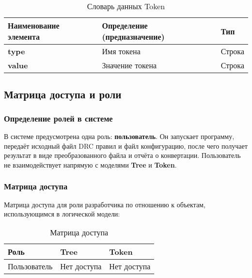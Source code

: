 \begin{longtable}{|p{3.5cm}|p{5cm}|p{5cm}|}
	\caption{Словарь данных Token} \\
	\hline
	\textbf{Наименование элемента}
	& \textbf{Определение (предназначение)}
	& \textbf{Тип} \\
	\hline
	\endhead
	\textbf{type} & Имя токена & Строка \\ \hline
	\textbf{value} & Значение токена & Строка \\ \hline
\end{longtable}

\subsection{Матрица доступа и роли}

\subsubsection{Определение ролей в системе}

В системе предусмотрена одна роль: \textbf{пользователь}.
Он запускает программу, передаёт исходный файл DRC правил и файл конфигурацию,
после чего получает результат в виде преобразованного файла
и отчёта о конвертации.
Пользователь не взаимодействует напрямую
с моделями \textbf{Tree} и \textbf{Token}.

\subsubsection{Матрица доступа}

Матрица доступа для роли разработчика по отношению к объектам,
использующимся в логической модели:

\begin{longtable}{|p{3.5cm}|p{5cm}|p{5cm}|}
	\caption{Матрица доступа} \\
	\hline
	\textbf{Роль} & \textbf{Tree} & \textbf{Token} \\
	\hline
	\endhead
	Пользователь & Нет доступа & Нет доступа \\ \hline
\end{longtable}
